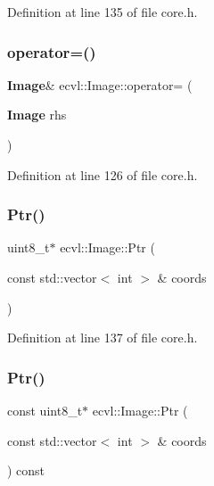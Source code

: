 Definition at line 135 of file core.\+h.

\mbox{\label{classecvl_1_1_image_ab8bf9eacc2910ff606ef83f56f89aba1}} 
\subsubsection{operator=()}
{\footnotesize\ttfamily \textbf{ Image}\& ecvl\+::\+Image\+::operator= (\begin{DoxyParamCaption}\item[{\textbf{ Image}}]{rhs }\end{DoxyParamCaption})\hspace{0.3cm}{\ttfamily [inline]}}



Definition at line 126 of file core.\+h.

\mbox{\label{classecvl_1_1_image_ac666790c7b5bcdb955c7d32938b1f0f9}} 
\subsubsection{Ptr()\hspace{0.1cm}{\footnotesize\ttfamily [1/2]}}
{\footnotesize\ttfamily uint8\+\_\+t$\ast$ ecvl\+::\+Image\+::\+Ptr (\begin{DoxyParamCaption}\item[{const std\+::vector$<$ int $>$ \&}]{coords }\end{DoxyParamCaption})\hspace{0.3cm}{\ttfamily [inline]}}



Definition at line 137 of file core.\+h.

\mbox{\label{classecvl_1_1_image_a8ea863e2e0573571b5cdf863061d1ec3}} 
\subsubsection{Ptr()\hspace{0.1cm}{\footnotesize\ttfamily [2/2]}}
{\footnotesize\ttfamily const uint8\+\_\+t$\ast$ ecvl\+::\+Image\+::\+Ptr (\begin{DoxyParamCaption}\item[{const std\+::vector$<$ int $>$ \&}]{coords }\end{DoxyParamCaption}) const\hspace{0.3cm}{\ttfamily [inline]}}



